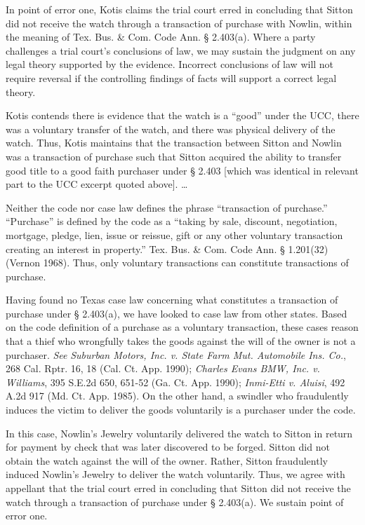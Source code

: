 In point of error one, Kotis claims the trial court erred in concluding that
Sitton did not receive the watch through a transaction of purchase with Nowlin,
within the meaning of Tex. Bus. \& Com. Code Ann. {\S} 2.403(a). Where a party
challenges a trial court's conclusions of law, we may sustain the judgment on
any legal theory supported by the evidence. Incorrect conclusions of law will
not require reversal if the controlling findings of facts will support a
correct legal theory.

Kotis contends there is evidence that the watch is a ``good'' under the UCC,
there was a voluntary transfer of the watch, and there was physical delivery of
the watch. Thus, Kotis maintains that the transaction between Sitton and Nowlin
was a transaction of purchase such that Sitton acquired the ability to transfer
good title to a good faith purchaser under {\S} 2.403 [which was identical in
relevant part to the UCC excerpt quoted above]. \ldots

Neither the code nor case law defines the phrase ``transaction of purchase.''
``Purchase'' is defined by the code as a ``taking by sale, discount,
negotiation, mortgage, pledge, lien, issue or reissue, gift or any other
voluntary transaction creating an interest in property.'' Tex. Bus. \& Com.
Code Ann. {\S} 1.201(32) (Vernon 1968). Thus, only voluntary transactions can
constitute transactions of purchase.

Having found no Texas case law concerning what constitutes a transaction of
purchase under {\S} 2.403(a), we have looked to case law from other states.
Based on the code definition of a purchase as a voluntary transaction, these
cases reason that a thief who wrongfully takes the goods against the will of
the owner is not a purchaser. \textit{See} \textit{Suburban Motors, Inc. v.
State Farm Mut. Automobile Ins. Co.}, 268 Cal. Rptr. 16, 18 (Cal. Ct. App.
1990); \textit{Charles Evans BMW, Inc. v. Williams}, 395 S.E.2d 650, 651-52 (Ga.
Ct. App. 1990); \textit{Inmi-Etti v. Aluisi}, 492 A.2d 917 (Md. Ct. App. 1985).
On the other hand, a swindler who fraudulently induces the victim to deliver
the goods voluntarily is a purchaser under the code.

In this case, Nowlin's Jewelry voluntarily delivered the watch to Sitton in
return for payment by check that was later discovered to be forged. Sitton did
not obtain the watch against the will of the owner. Rather, Sitton fraudulently
induced Nowlin's Jewelry to deliver the watch voluntarily. Thus, we agree with
appellant that the trial court erred in concluding that Sitton did not receive
the watch through a transaction of purchase under {\S} 2.403(a). We sustain
point of error one.

